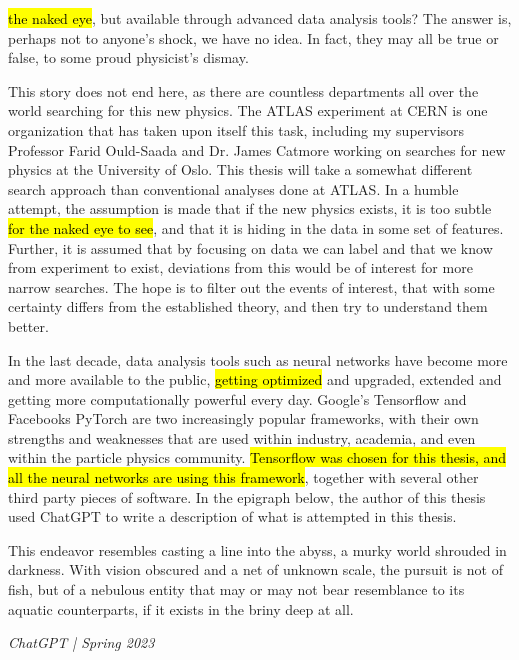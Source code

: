\hl{the naked eye}, but available through advanced data analysis tools? The answer is, perhaps not to 
anyone's shock, we have no idea. In fact, they may all be true or false, to some proud 
physicist's dismay. \par 
This story does not end here, as there are countless departments all 
over the world searching for this new physics. The ATLAS experiment at CERN is one organization that 
 has taken upon itself this task, including my supervisors Professor Farid Ould-Saada and Dr. James Catmore working 
on searches for new physics at the University of Oslo. This thesis will take a somewhat different search 
approach than conventional analyses done at ATLAS. In a humble attempt, the assumption is made that 
if the new physics exists, it is too subtle \hl{for the naked eye to see}, and that it is hiding in the data
in some set of features. Further, it is assumed that by focusing on data we can label and that we know 
from experiment to exist, deviations from this would be of interest for more narrow searches. The hope is 
to filter out the events of interest, that with some certainty differs from the established theory, 
and then try to understand them better. \par 
In the last decade, data analysis tools such as neural networks have become more and more available 
to the public, \hl{getting optimized} and upgraded, extended and getting more computationally powerful every 
day. Google's Tensorflow\cite{tensorflow-whitepaper} and Facebooks PyTorch\cite{paszkepytorch} 
are two increasingly popular frameworks, with their own strengths and weaknesses that are used within industry, 
academia, and even within the particle physics community. \hl{Tensorflow was chosen for this thesis, and 
all the neural networks are using this framework}, together with several other third party pieces of software. 
In the epigraph below, the author of this thesis used ChatGPT to write a description of what is 
attempted in this thesis. 

\epigraph{
    This endeavor resembles casting a line into the abyss, a murky world 
shrouded in darkness. With vision obscured and a net of unknown scale, 
the pursuit is not of fish, but of a nebulous entity that may or may 
not bear resemblance to its aquatic counterparts, if it exists in 
the briny deep at all.}{\textit{ChatGPT | Spring 2023}}

\par 

